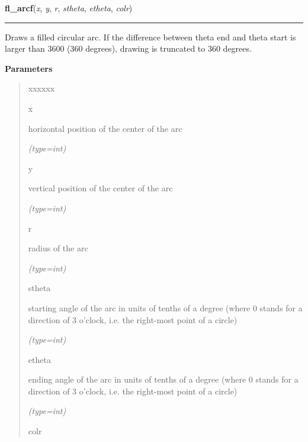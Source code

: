 \hspace{.8\funcindent}\begin{boxedminipage}{\funcwidth}

    \raggedright \textbf{fl\_arcf}(\textit{x}, \textit{y}, \textit{r}, \textit{stheta}, \textit{etheta}, \textit{colr})

    \vspace{-1.5ex}

    \rule{\textwidth}{0.5\fboxrule}
\setlength{\parskip}{2ex}
    Draws a filled circular arc. If the difference between theta end and 
    theta start is larger than 3600 (360 degrees), drawing is truncated to 
    360 degrees.

\setlength{\parskip}{1ex}
      \textbf{Parameters}
      \vspace{-1ex}

      \begin{quote}
        \begin{Ventry}{xxxxxx}

          \item[x]

          horizontal position of the center of the arc

            {\it (type=int)}

          \item[y]

          vertical position of the center of the arc

            {\it (type=int)}

          \item[r]

          radius of the arc

            {\it (type=int)}

          \item[stheta]

          starting angle of the arc in units of tenths of a degree (where 0
          stands for a direction of 3 o'clock, i.e. the right-most point of
          a circle)

            {\it (type=int)}

          \item[etheta]

          ending angle of the arc in units of tenths of a degree (where 0 
          stands for a direction of 3 o'clock, i.e. the right-most point of
          a circle)

            {\it (type=int)}

          \item[colr]


\end{Ventry}
\end{quote}
\end{boxedminipage}
